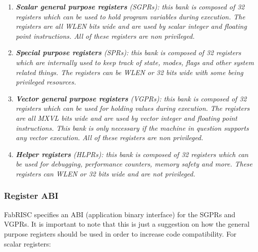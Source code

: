        \begin{enumerate}

            \item \textit{\textbf{Scalar general purpose registers} (SGPRs): this bank is composed of 32 registers which can be used to hold program variables during execution. The registers are all WLEN bits wide and are used by scalar integer and floating point instructions. All of these registers are non privileged.}

            \item \textit{\textbf{Special purpose registers} (SPRs): this bank is composed of 32 registers which are internally used to keep track of state, modes, flags and other system related things. The registers can be WLEN or 32 bits wide with some being privileged resources.}

            \item \textit{\textbf{Vector general purpose registers} (VGPRs): this bank is composed of 32 registers which can be used for holding values during execution. The registers are all MXVL bits wide and are used by vector integer and floating point instructions. This bank is only necessary if the machine in question supports any vector execution. All of these registers are non privileged.}

            \item \textit{\textbf{Helper registers} (HLPRs): this bank is composed of 32 registers which can be used for debugging, performance counters, memory safety and more. These registers can WLEN or 32 bits wide and are not privileged.}

        \end{enumerate}

        \clearpage
        
        \vspace{10pt}

        \subsubsection{Register ABI}

            \vspace{10pt}

            FabRISC specifies an ABI (application binary interface) for the SGPRs and VGPRs. It is important to note that this is just a suggestion on how the general purpose registers should be used in order to increase code compatibility. For scalar registers:

